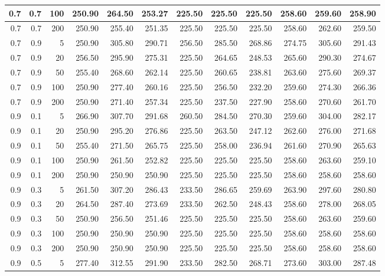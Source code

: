 \begin{longtable}{|r|r|r|r|r|r|r|r|r|r|r|r|}
		\hline
		0.7 & 0.7 & 100 & 250.90 & 264.50 & 253.27 & 225.50 & 225.50 & 225.50 & 258.60 & 259.60 & 258.90\\
		\hline
		0.7 & 0.7 & 200 & 250.90 & 255.40 & 251.35 & 225.50 & 225.50 & 225.50 & 258.60 & 262.60 & 259.50\\
		\hline
		0.7 & 0.9 & 5 & 250.90 & 305.80 & 290.71 & 256.50 & 285.50 & 268.86 & 274.75 & 305.60 & 291.43\\
		\hline
		0.7 & 0.9 & 20 & 256.50 & 295.90 & 275.31 & 225.50 & 264.65 & 248.53 & 265.60 & 290.30 & 274.67\\
		\hline
		0.7 & 0.9 & 50 & 255.40 & 268.60 & 262.14 & 225.50 & 260.65 & 238.81 & 263.60 & 275.60 & 269.37\\
		\hline
		0.7 & 0.9 & 100 & 250.90 & 277.40 & 260.16 & 225.50 & 256.50 & 232.20 & 259.60 & 274.30 & 266.36\\
		\hline
		0.7 & 0.9 & 200 & 250.90 & 271.40 & 257.34 & 225.50 & 237.50 & 227.90 & 258.60 & 270.60 & 261.70\\
		\hline
		0.9 & 0.1 & 5 & 266.90 & 307.70 & 291.68 & 260.50 & 284.50 & 270.30 & 259.60 & 304.00 & 282.17\\
		\hline
		0.9 & 0.1 & 20 & 250.90 & 295.20 & 276.86 & 225.50 & 263.50 & 247.12 & 262.60 & 276.00 & 271.68\\
		\hline
		0.9 & 0.1 & 50 & 255.40 & 271.50 & 265.75 & 225.50 & 258.00 & 236.94 & 261.60 & 270.90 & 265.63\\
		\hline
		0.9 & 0.1 & 100 & 250.90 & 261.50 & 252.82 & 225.50 & 225.50 & 225.50 & 258.60 & 263.60 & 259.10\\
		\hline
		0.9 & 0.1 & 200 & 250.90 & 250.90 & 250.90 & 225.50 & 225.50 & 225.50 & 258.60 & 258.60 & 258.60\\
		\hline
		0.9 & 0.3 & 5 & 261.50 & 307.20 & 286.43 & 233.50 & 286.65 & 259.69 & 263.90 & 297.60 & 280.80\\
		\hline
		0.9 & 0.3 & 20 & 264.50 & 287.40 & 273.69 & 233.50 & 262.50 & 248.43 & 258.60 & 278.00 & 268.05\\
		\hline
		0.9 & 0.3 & 50 & 250.90 & 256.50 & 251.46 & 225.50 & 225.50 & 225.50 & 258.60 & 263.60 & 259.60\\
		\hline
		0.9 & 0.3 & 100 & 250.90 & 250.90 & 250.90 & 225.50 & 225.50 & 225.50 & 258.60 & 258.60 & 258.60\\
		\hline
		0.9 & 0.3 & 200 & 250.90 & 250.90 & 250.90 & 225.50 & 225.50 & 225.50 & 258.60 & 258.60 & 258.60\\
		\hline
		0.9 & 0.5 & 5 & 277.40 & 312.55 & 291.90 & 233.50 & 282.50 & 268.71 & 273.60 & 303.00 & 287.48\\

\end{longtable}
